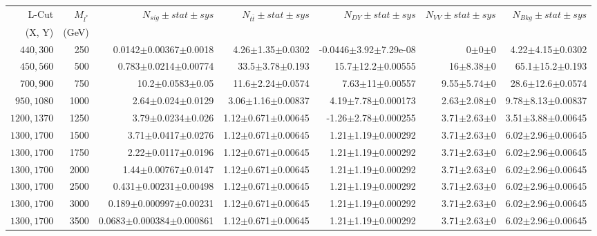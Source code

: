 \documentclass[]{article}
\begin{document}
\begin{table}
\begin{center}
\scriptsize{
\begin{tabular}{ |r|r|r|r|r|r|r|}
\hline 
L-Cut & $M_{l^*}$ & $N_{sig}\pm stat \pm sys $ &$N_{t\bar{t}}\pm stat \pm sys $ & $N_{DY}\pm stat \pm sys $ & $N_{VV}\pm stat \pm sys $ &$N_{Bkg}\pm stat \pm sys$\\
(X, Y) & (GeV) & && &&\\
\hline 
$440, 300$ & 250 & 0.0142$\pm$0.00367$\pm$0.0018 & 4.26$\pm$1.35$\pm$0.0302 & -0.0446$\pm$3.92$\pm$7.29e-08 & 0$\pm$0$\pm$0 & 4.22$\pm$4.15$\pm$0.0302 \\
$450, 560$ & 500 & 0.783$\pm$0.0214$\pm$0.00774 & 33.5$\pm$3.78$\pm$0.193 & 15.7$\pm$12.2$\pm$0.00555 & 16$\pm$8.38$\pm$0 & 65.1$\pm$15.2$\pm$0.193 \\
$700, 900$ & 750 & 10.2$\pm$0.0583$\pm$0.05 & 11.6$\pm$2.24$\pm$0.0574 & 7.63$\pm$11$\pm$0.00557 & 9.55$\pm$5.74$\pm$0 & 28.6$\pm$12.6$\pm$0.0574 \\
$950, 1080$ & 1000 & 2.64$\pm$0.024$\pm$0.0129 & 3.06$\pm$1.16$\pm$0.00837 & 4.19$\pm$7.78$\pm$0.000173 & 2.63$\pm$2.08$\pm$0 & 9.78$\pm$8.13$\pm$0.00837 \\
$1200, 1370$ & 1250 & 3.79$\pm$0.0234$\pm$0.026 & 1.12$\pm$0.671$\pm$0.00645 & -1.26$\pm$2.78$\pm$0.000255 & 3.71$\pm$2.63$\pm$0 & 3.51$\pm$3.88$\pm$0.00645 \\
$1300, 1700$ & 1500 & 3.71$\pm$0.0417$\pm$0.0276 & 1.12$\pm$0.671$\pm$0.00645 & 1.21$\pm$1.19$\pm$0.000292 & 3.71$\pm$2.63$\pm$0 & 6.02$\pm$2.96$\pm$0.00645 \\
$1300, 1700$ & 1750 & 2.22$\pm$0.0117$\pm$0.0196 & 1.12$\pm$0.671$\pm$0.00645 & 1.21$\pm$1.19$\pm$0.000292 & 3.71$\pm$2.63$\pm$0 & 6.02$\pm$2.96$\pm$0.00645 \\
$1300, 1700$ & 2000 & 1.44$\pm$0.00767$\pm$0.0147 & 1.12$\pm$0.671$\pm$0.00645 & 1.21$\pm$1.19$\pm$0.000292 & 3.71$\pm$2.63$\pm$0 & 6.02$\pm$2.96$\pm$0.00645 \\
$1300, 1700$ & 2500 & 0.431$\pm$0.00231$\pm$0.00498 & 1.12$\pm$0.671$\pm$0.00645 & 1.21$\pm$1.19$\pm$0.000292 & 3.71$\pm$2.63$\pm$0 & 6.02$\pm$2.96$\pm$0.00645 \\
$1300, 1700$ & 3000 & 0.189$\pm$0.000997$\pm$0.00231 & 1.12$\pm$0.671$\pm$0.00645 & 1.21$\pm$1.19$\pm$0.000292 & 3.71$\pm$2.63$\pm$0 & 6.02$\pm$2.96$\pm$0.00645 \\
$1300, 1700$ & 3500 & 0.0683$\pm$0.000384$\pm$0.000861 & 1.12$\pm$0.671$\pm$0.00645 & 1.21$\pm$1.19$\pm$0.000292 & 3.71$\pm$2.63$\pm$0 & 6.02$\pm$2.96$\pm$0.00645 \\

\end{tabular}}
\end{center}
\end{table}
\end{document}
